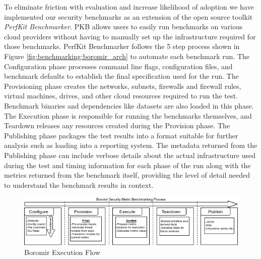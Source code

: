 
To eliminate friction with evaluation and increase likelihood of adoption we have implemented our security benchmarks as an extension of the open source toolkit \textit{PerfKit Benchmarker}\cite{zaber_pkb}. PKB allows users to easily run benchmarks on various cloud providers without having to manually set up the infrastructure required for those benchmarks. PerfKit Benchmarker follows the 5 step process shown in Figure \ref{fig:benchmarking:boromir_arch} to automate each benchmark run. The Configuration phase processes command line flags, configuration files, and benchmark defaults to establish the final specification used for the run. The Provisioning phase creates the networks, subnets, firewalls and firewall rules, virtual machines, drives, and other cloud resources required to run the test. Benchmark binaries and dependencies like datasets are also loaded in this phase. The Execution phase is responsible for running the benchmarks themselves, and Teardown releases any resources created during the Provision phase. The Publishing phase packages the test results into a format suitable for further analysis such as  loading into a reporting system. The metadata returned from the Publishing phase can include verbose details about the actual infrastructure used during the test and timing information for each phase of the run along with the metrics returned from the benchmark itself, providing the level of detail needed to understand the benchmark results in context. 



\begin{figure}[ht]
\centering
\includegraphics[width=\textwidth]{resource/img/ch_benchmarking/boromir_pkb_arch.png}
\caption{Boromir Execution Flow}
\label{fig:benchmarking:background:pkb_arch}
\end{figure} 

